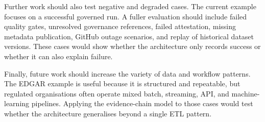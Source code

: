 Further work should also test negative and degraded cases. The current example
focuses on a successful governed run. A fuller evaluation should include failed
quality gates, unresolved governance references, failed attestation, missing
metadata publication, GitHub outage scenarios, and replay of historical dataset
versions. These cases would show whether the architecture only records success
or whether it can also explain failure.

Finally, future work should increase the variety of data and workflow patterns.
The EDGAR example is useful because it is structured and repeatable, but
regulated organisations often operate mixed batch, streaming, API, and
machine-learning pipelines. Applying the evidence-chain model to those cases
would test whether the architecture generalises beyond a single ETL pattern.
